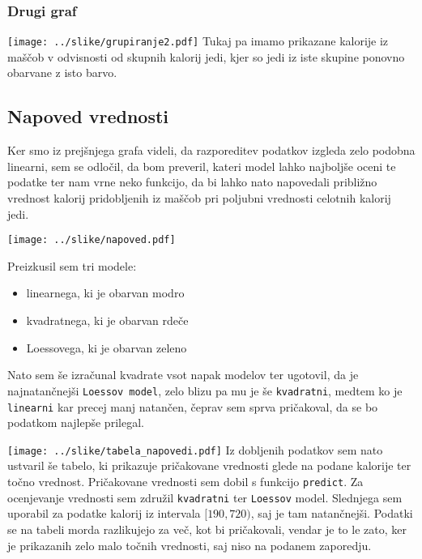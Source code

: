 \documentclass[hidelinks, 11pt,a4paper]{article}
\begin{document}
\subsubsection{Drugi graf}
\texttt{[image: ../slike/grupiranje2.pdf]}
Tukaj pa imamo prikazane kalorije iz maščob v odvisnosti od skupnih kalorij jedi, kjer so jedi iz iste skupine ponovno obarvane z isto barvo.

\newpage
\subsection{Napoved vrednosti}
Ker smo iz prejšnjega grafa videli, da razporeditev podatkov izgleda zelo podobna linearni, sem se odločil, da bom preveril, kateri model lahko najboljše oceni te podatke ter nam vrne neko funkcijo, da bi lahko nato napovedali približno vrednost kalorij pridobljenih iz maščob pri poljubni vrednosti celotnih kalorij jedi. 

\texttt{[image: ../slike/napoved.pdf]}

\noindent
Preizkusil sem tri modele:
\begin{itemize}
	\item linearnega, ki je obarvan modro
	\item kvadratnega, ki je obarvan rdeče
	\item Loessovega, ki je obarvan zeleno
\end{itemize}

\noindent
Nato sem še izračunal kvadrate vsot napak modelov ter ugotovil, da je najnatančnejši \verb|Loessov model|, zelo blizu pa mu je še \verb|kvadratni|, medtem ko je \verb|linearni| kar precej manj natančen, čeprav sem sprva pričakoval, da se bo podatkom najlepše prilegal.

\texttt{[image: ../slike/tabela\_napovedi.pdf]}
\noindent
Iz dobljenih podatkov sem nato ustvaril še tabelo, ki prikazuje pričakovane vrednosti glede na podane kalorije ter točno vrednost. Pričakovane vrednosti sem dobil s funkcijo \verb|predict|. Za ocenjevanje vrednosti sem združil \verb|kvadratni| ter \verb|Loessov| model. Slednjega sem uporabil za podatke kalorij iz intervala $[190, 720)$, saj je tam natančnejši. Podatki se na tabeli morda razlikujejo za več, kot bi pričakovali, vendar je to le zato, ker je prikazanih zelo malo točnih vrednosti, saj niso na podanem zaporedju.

\begin{figure}
\end{figure}
\end{document}
